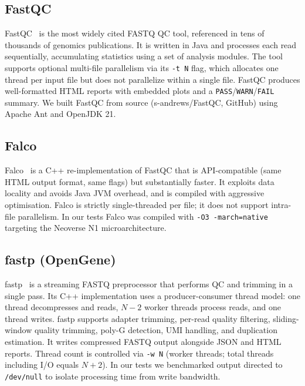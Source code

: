 \documentclass[a4paper,12pt]{article}
\begin{document}
\subsection{FastQC}
\label{sec:fastqc}

FastQC~\cite{Andrews2010FastQC} is the most widely cited FASTQ QC tool,
referenced in tens of thousands of genomics publications.  It is written in
Java and processes each read sequentially, accumulating statistics using a set
of analysis modules.  The tool supports optional multi-file parallelism via its
\texttt{-t~N} flag, which allocates one thread per input file but does not
parallelize within a single file.  FastQC produces well-formatted HTML reports
with embedded plots and a \texttt{PASS}/\texttt{WARN}/\texttt{FAIL} summary.
We built FastQC from source (s-andrews/FastQC, GitHub) using Apache Ant and
OpenJDK 21.

\subsection{Falco}
\label{sec:falco}

Falco~\cite{deSenaBrandine2021Falco} is a C++ re-implementation of FastQC that
is API-compatible (same HTML output format, same flags) but substantially
faster.  It exploits data locality and avoids Java JVM overhead, and is compiled
with aggressive optimisation.  Falco is strictly single-threaded per file;
it does not support intra-file parallelism.  In our tests Falco was compiled
with \texttt{-O3~-march=native} targeting the Neoverse N1 microarchitecture.

\subsection{fastp (OpenGene)}
\label{sec:fastp-og}

fastp~\cite{Chen2018fastp} is a streaming FASTQ preprocessor that performs QC
and trimming in a single pass.  Its C++ implementation uses a producer-consumer
thread model: one thread decompresses and reads, $N{-}2$ worker threads process
reads, and one thread writes.  fastp supports adapter trimming, per-read quality
filtering, sliding-window quality trimming, poly-G detection, UMI handling, and
duplication estimation.  It writes compressed FASTQ output alongside JSON and
HTML reports.  Thread count is controlled via \texttt{-w~N} (worker threads;
total threads including I/O equals $N+2$).  In our tests we benchmarked output
directed to \texttt{/dev/null} to isolate processing time from write bandwidth.
\end{document}
